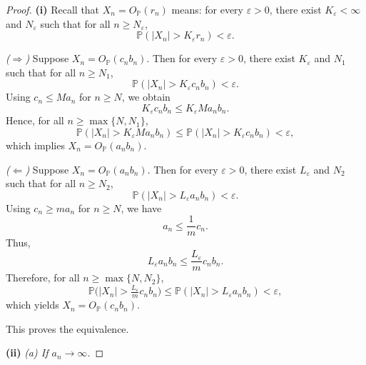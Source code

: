 \documentclass[12pt]{article}
\renewcommand{\(}{\left(}%
\renewcommand{\)}{\right)}%
\renewcommand{\[}{\left[}%
\renewcommand{\]}{\right]}%
\newtheorem{proof}{Proof.}}
\begin{document}
\begin{proof}
\textbf{(i)}
Recall that $X_n = O_{\mathbb{P}}(r_n)$ means: for every $\varepsilon>0$, there exist $K_\varepsilon<\infty$ and $N_\varepsilon$ such that for all $n\ge N_\varepsilon$,
\begin{equation*}
\mathbb{P}(|X_n| > K_\varepsilon r_n) < \varepsilon.
\end{equation*}

\smallskip
\emph{($\Rightarrow$)} Suppose $X_n = O_{\mathbb{P}}(c_n b_n)$. Then for every $\varepsilon>0$, there exist $K_\varepsilon$ and $N_1$ such that for all $n\ge N_1$,
\begin{equation*}
\mathbb{P}(|X_n| > K_\varepsilon c_n b_n) < \varepsilon.
\end{equation*}
Using $c_n \le M a_n$ for $n\ge N$, we obtain
\begin{equation*}
K_\varepsilon c_n b_n \le K_\varepsilon M a_n b_n.
\end{equation*}
Hence, for all $n\ge \max\{N,N_1\}$,
\begin{equation*}
\mathbb{P}(|X_n| > K_\varepsilon M a_n b_n)
\le 
\mathbb{P}(|X_n| > K_\varepsilon c_n b_n)
< \varepsilon,
\end{equation*}
which implies $X_n = O_{\mathbb{P}}(a_n b_n)$.

\smallskip
\emph{($\Leftarrow$)} Suppose $X_n = O_{\mathbb{P}}(a_n b_n)$. Then for every $\varepsilon>0$, there exist $L_\varepsilon$ and $N_2$ such that for all $n\ge N_2$,
\begin{equation*}
\mathbb{P}(|X_n| > L_\varepsilon a_n b_n) < \varepsilon.
\end{equation*}
Using $c_n \ge m a_n$ for $n\ge N$, we have
\begin{equation*}
a_n \le \frac{1}{m} c_n.
\end{equation*}
Thus,
\begin{equation*}
L_\varepsilon a_n b_n \le \frac{L_\varepsilon}{m} c_n b_n.
\end{equation*}
Therefore, for all $n\ge \max\{N,N_2\}$,
\begin{equation*}
\mathbb{P}\Big(|X_n| > \tfrac{L_\varepsilon}{m} c_n b_n\Big)
\le 
\mathbb{P}(|X_n| > L_\varepsilon a_n b_n)
< \varepsilon,
\end{equation*}
which yields $X_n = O_{\mathbb{P}}(c_n b_n)$.

\smallskip
This proves the equivalence.

\bigskip
\noindent
\textbf{(ii)}
\smallskip
\emph{(a) If $a_n \to \infty$.}


\end{proof}
\end{document}
